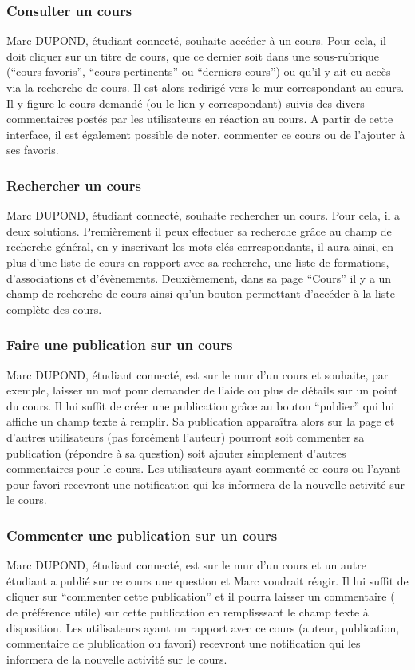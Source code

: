 \subsubsection*{Consulter un cours}
Marc DUPOND, étudiant connecté, souhaite accéder à un cours. Pour cela, il doit cliquer sur un titre de cours, que ce dernier soit dans une sous-rubrique (“cours favoris”, “cours pertinents” ou “derniers cours”) ou qu’il y ait eu accès via la recherche de cours. Il est alors redirigé vers le mur correspondant au cours. Il y figure le cours demandé (ou le lien y correspondant) suivis des divers commentaires postés par les utilisateurs en réaction au cours. A partir de cette interface, il est également possible de noter, commenter ce cours ou de l’ajouter à ses favoris. 
\subsubsection*{Rechercher un cours}
Marc DUPOND, étudiant connecté, souhaite rechercher un cours. Pour cela, il a deux solutions. Premièrement il peux effectuer sa recherche grâce au champ de recherche général, en y inscrivant les mots clés correspondants, il aura ainsi, en plus d’une liste de cours en rapport avec sa recherche, une liste de formations, d’associations et d'évènements. Deuxièmement, dans sa page “Cours” il y a un champ de recherche de cours ainsi qu’un bouton permettant d’accéder à la liste complète des cours.
\subsubsection*{Faire une publication sur un cours}
Marc DUPOND, étudiant connecté, est sur le mur d’un cours et souhaite, par exemple, laisser un mot pour demander de l’aide ou plus de détails sur un point du cours. Il lui suffit de créer une publication grâce au bouton “publier” qui lui affiche un champ texte à remplir. Sa publication apparaîtra alors sur la page et d’autres utilisateurs (pas forcément l’auteur) pourront soit commenter sa publication (répondre à sa question) soit ajouter simplement d’autres commentaires pour le cours. Les utilisateurs ayant commenté ce cours ou l’ayant pour favori recevront une notification qui les informera de la nouvelle activité sur le cours.
\subsubsection*{Commenter une publication sur un cours}
Marc DUPOND, étudiant connecté, est sur le mur d’un cours et un autre étudiant a publié sur ce cours une question et Marc voudrait réagir. Il lui suffit de cliquer sur “commenter cette publication” et il pourra laisser un commentaire ( de préférence utile) sur cette publication en remplisssant le champ texte à disposition. Les utilisateurs ayant un rapport avec ce cours (auteur, publication, commentaire de plublication ou favori) recevront une notification qui les informera de la nouvelle activité sur le cours.

